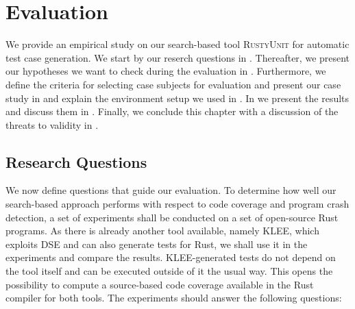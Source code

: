 \documentclass[paper=a4,%
  twoside,%
  BCOR4mm,%
  abstract=true,%
  toc=bibliography,%
  chapterprefix=true,%
  toc=bibliographynumbered,%
  open=right,%
  english,%
  pagesize=pdftex]{scrreprt}
\begin{document}
\clearpage
\chapter{Evaluation}
\label{chap:evaluation}

We provide an empirical study on our search-based tool \textsc{RustyUnit} for automatic test case generation. We start by our reserch questions in . Thereafter, we present our hypotheses we want to check during the evaluation in . Furthermore, we define the criteria for selecting case subjects for evaluation and present our case study in  and explain the environment setup we used in . In  we present the results and discuss them in . Finally, we conclude this chapter with a discussion of the threats to validity in .


\section{Research Questions}
\label{sec:research-questions}
We now define questions that guide our evaluation. To determine how well our search-based approach performs with respect to code coverage and program crash detection, a set of experiments shall be conducted on a set of open-source Rust programs. As there is already another tool available, namely \textsc{KLEE}, which exploits \ac{DSE} and can also generate tests for Rust, we shall use it in the experiments and compare the results. \textsc{KLEE}-generated tests do not depend on the tool itself and can be executed outside of it the usual way. This opens the possibility to compute a source-based code coverage available in the Rust compiler for both tools. The experiments should answer the following questions:

\end{document}
